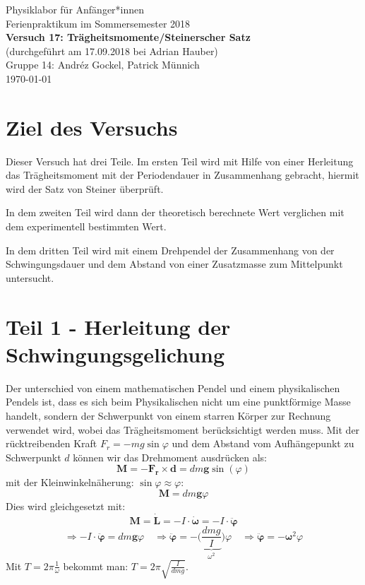 \documentclass[11pt,a4paper]{article}
\renewcommand{\vec}{\boldsymbol}
\begin{document}
{
\centering 
\large 
Physiklabor für Anf\"anger*innen \\
Ferienpraktikum im Sommersemester 2018 \\[4mm]
\textbf{\LARGE 
Versuch 17: Trägheitsmomente/Steinerscher Satz
} \\[3mm]
(durchgef\"uhrt am 17.09.2018 bei Adrian Hauber)\\
Gruppe 14: Andréz Gockel, Patrick M\"unnich\\ 
\today \\[10mm]
}
\vfill
\tableofcontents
\vfill
\pagebreak

\section{Ziel des Versuchs}

Dieser Versuch hat drei Teile. Im ersten Teil wird mit Hilfe von einer Herleitung das Trägheitsmoment mit der Periodendauer in Zusammenhang gebracht, hiermit wird der Satz von Steiner überprüft.  

In dem zweiten Teil wird dann der theoretisch berechnete Wert verglichen mit dem experimentell bestimmten Wert. 

In dem dritten Teil wird mit einem Drehpendel der Zusammenhang von der Schwingungsdauer und dem Abstand von einer Zusatzmasse zum Mittelpunkt untersucht.
\section{Teil 1 - Herleitung der Schwingungsgelichung}

Der unterschied von einem mathematischen Pendel und einem physikalischen Pendels ist, dass es sich beim Physikalischen nicht um eine punktförmige Masse handelt, sondern der Schwerpunkt von einem starren Körper zur Rechnung verwendet wird, wobei das Trägheitsmoment berücksichtigt werden muss. Mit der rücktreibenden Kraft $F_r = -mg\sin\varphi$ und dem Abstand vom Aufhängepunkt zu Schwerpunkt $d$ können wir das Drehmoment ausdrücken als:
$$\vec{M} = -\vec{F_r} \times \vec{d} = dm\vec{g}\sin(\varphi)$$
mit der Kleinwinkelnäherung: $\sin\varphi \approx \varphi$:
$$\vec{M} = dm\vec{g}\varphi$$
Dies wird gleichgesetzt mit:
$$\vec{M} = \vec{\dot L} = - I \cdot \vec{\dot\omega} = - I \cdot \vec{\ddot\varphi}$$
$$\Rightarrow - I \cdot \vec{\ddot\varphi} = dm\vec{g}\varphi \quad \Rightarrow \vec{\ddot\varphi} = - \bigg(\underbrace{\frac{dmg}{I}}_{\omega^2}\bigg)\varphi \quad \Rightarrow \vec{\ddot\varphi} = - \vec\omega^2 \varphi$$
Mit $T = 2\pi \frac{1}{\omega}$ bekommt man: $T = 2\pi \sqrt{\frac{I}{dmg}}$.
\end{document}
